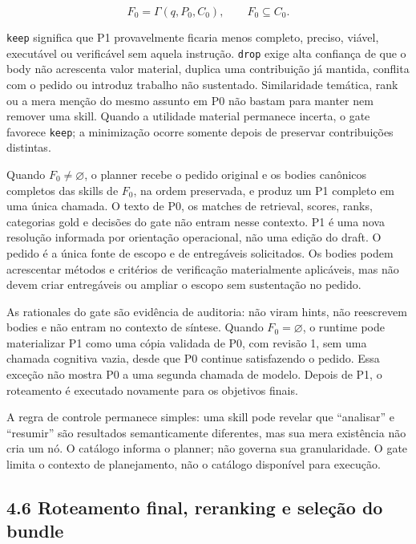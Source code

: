 \documentclass[12pt,a4paper]{article}
\begin{document}
\begin{equation}
F_0 = \Gamma(q, P_0, C_0), \qquad F_0 \subseteq C_0.
\end{equation}

\texttt{keep} significa que P1 provavelmente ficaria menos completo, preciso, viável, executável ou verificável sem aquela instrução. \texttt{drop} exige alta confiança de que o body não acrescenta valor material, duplica uma contribuição já mantida, conflita com o pedido ou introduz trabalho não sustentado. Similaridade temática, rank ou a mera menção do mesmo assunto em P0 não bastam para manter nem remover uma skill. Quando a utilidade material permanece incerta, o gate favorece \texttt{keep}; a minimização ocorre somente depois de preservar contribuições distintas.

Quando \(F_0 \neq \varnothing\), o planner recebe o pedido original e os bodies canônicos completos das skills de \(F_0\), na ordem preservada, e produz um P1 completo em uma única chamada. O texto de P0, os matches de retrieval, scores, ranks, categorias gold e decisões do gate não entram nesse contexto. P1 é uma nova resolução informada por orientação operacional, não uma edição do draft. O pedido é a única fonte de escopo e de entregáveis solicitados. Os bodies podem acrescentar métodos e critérios de verificação materialmente aplicáveis, mas não devem criar entregáveis ou ampliar o escopo sem sustentação no pedido.

As rationales do gate são evidência de auditoria: não viram hints, não reescrevem bodies e não entram no contexto de síntese. Quando \(F_0 = \varnothing\), o runtime pode materializar P1 como uma cópia validada de P0, com revisão 1, sem uma chamada cognitiva vazia, desde que P0 continue satisfazendo o pedido. Essa exceção não mostra P0 a uma segunda chamada de modelo. Depois de P1, o roteamento é executado novamente para os objetivos finais.




A regra de controle permanece simples: uma skill pode revelar que “analisar” e “resumir” são resultados semanticamente diferentes, mas sua mera existência não cria um nó. O catálogo informa o planner; não governa sua granularidade. O gate limita o contexto de planejamento, não o catálogo disponível para execução.



\subsection*{4.6 Roteamento final, reranking e seleção do bundle}
\end{document}
